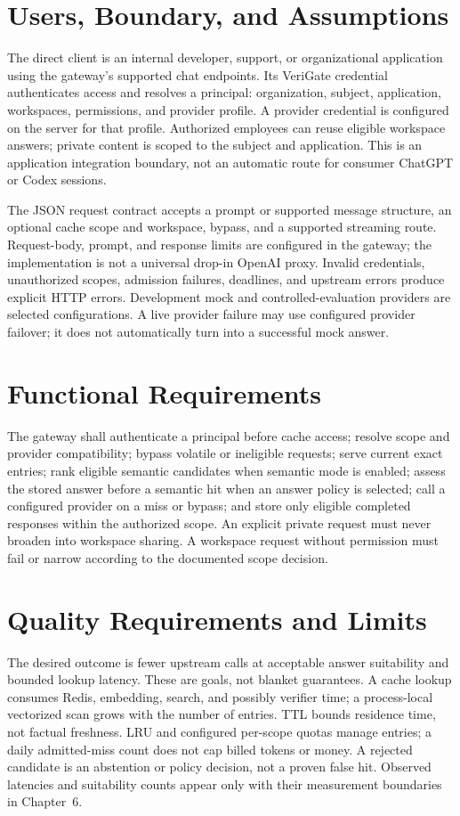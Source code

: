 \section{Users, Boundary, and Assumptions}
The direct client is an internal developer, support, or organizational application using the gateway's supported chat endpoints. Its VeriGate credential authenticates access and resolves a principal: organization, subject, application, workspaces, permissions, and provider profile. A provider credential is configured on the server for that profile. Authorized employees can reuse eligible workspace answers; private content is scoped to the subject and application. This is an application integration boundary, not an automatic route for consumer ChatGPT or Codex sessions.

The JSON request contract accepts a prompt or supported message structure, an optional cache scope and workspace, bypass, and a supported streaming route. Request-body, prompt, and response limits are configured in the gateway; the implementation is not a universal drop-in OpenAI proxy. Invalid credentials, unauthorized scopes, admission failures, deadlines, and upstream errors produce explicit HTTP errors. Development mock and controlled-evaluation providers are selected configurations. A live provider failure may use configured provider failover; it does not automatically turn into a successful mock answer.

\section{Functional Requirements}
The gateway shall authenticate a principal before cache access; resolve scope and provider compatibility; bypass volatile or ineligible requests; serve current exact entries; rank eligible semantic candidates when semantic mode is enabled; assess the stored answer before a semantic hit when an answer policy is selected; call a configured provider on a miss or bypass; and store only eligible completed responses within the authorized scope. An explicit private request must never broaden into workspace sharing. A workspace request without permission must fail or narrow according to the documented scope decision.

\section{Quality Requirements and Limits}
The desired outcome is fewer upstream calls at acceptable answer suitability and bounded lookup latency. These are goals, not blanket guarantees. A cache lookup consumes Redis, embedding, search, and possibly verifier time; a process-local vectorized scan grows with the number of entries. TTL bounds residence time, not factual freshness. LRU and configured per-scope quotas manage entries; a daily admitted-miss count does not cap billed tokens or money. A rejected candidate is an abstention or policy decision, not a proven false hit. Observed latencies and suitability counts appear only with their measurement boundaries in Chapter~6.

